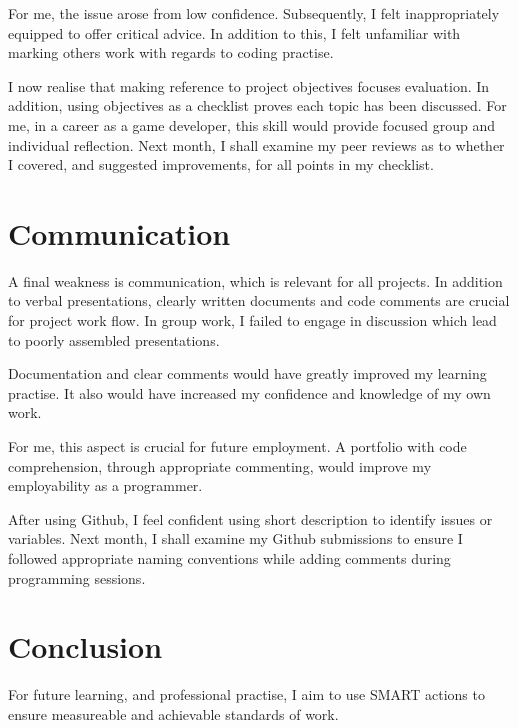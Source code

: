 \documentclass{scrartcl}
\begin{document}
For me, the issue arose from low confidence. Subsequently, I felt inappropriately equipped to offer critical advice. In addition to this, I felt unfamiliar with marking others work with regards to coding practise.

I now realise that making reference to project objectives focuses evaluation. In addition, using objectives as a checklist proves each topic has been discussed. For me, in a career as a game developer, this skill would provide focused group and individual reflection. Next month, I shall examine my peer reviews as to whether I covered, and suggested improvements, for all points in my checklist.

\section{Communication}

A final weakness is communication, which is relevant for all projects. In addition to verbal presentations, clearly written documents and code comments are crucial for project work flow. In group work, I failed to engage in discussion which lead to poorly assembled presentations.

Documentation and clear comments would have greatly improved my learning practise. It also would have increased my confidence and knowledge of my own work.

For me, this aspect is crucial for future employment. A portfolio with code comprehension, through appropriate commenting, would improve my employability as a programmer.

After using Github, I feel confident using short description to identify issues or variables. Next month, I shall examine my Github submissions to ensure I followed appropriate naming conventions while adding comments during programming sessions.

\section{Conclusion}

For future learning, and professional practise, I aim to use SMART actions to ensure measureable and achievable standards of work.

%
%
\end{document}
